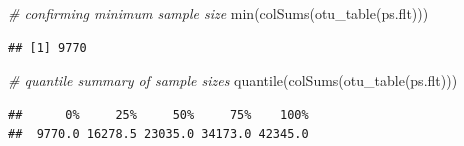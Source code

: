 \documentclass[
]{book}
\newenvironment{Shaded}{\begin{snugshade}}{\end{snugshade}}
\newcommand{\CommentTok}[1]{\textcolor[rgb]{0.56,0.35,0.01}{\textit{#1}}}
\newcommand{\FunctionTok}[1]{\textcolor[rgb]{0.00,0.00,0.00}{#1}}
\newcommand{\NormalTok}[1]{#1}
\begin{document}
\begin{Shaded}
\begin{Highlighting}[]
\CommentTok{\# confirming minimum sample size}
\FunctionTok{min}\NormalTok{(}\FunctionTok{colSums}\NormalTok{(}\FunctionTok{otu\_table}\NormalTok{(ps.flt)))}
\end{Highlighting}
\end{Shaded}

\begin{verbatim}
## [1] 9770
\end{verbatim}

\begin{Shaded}
\begin{Highlighting}[]
\CommentTok{\# quantile summary of sample sizes}
\FunctionTok{quantile}\NormalTok{(}\FunctionTok{colSums}\NormalTok{(}\FunctionTok{otu\_table}\NormalTok{(ps.flt)))}
\end{Highlighting}
\end{Shaded}

\begin{verbatim}
##      0%     25%     50%     75%    100% 
##  9770.0 16278.5 23035.0 34173.0 42345.0
\end{verbatim}
\end{document}
